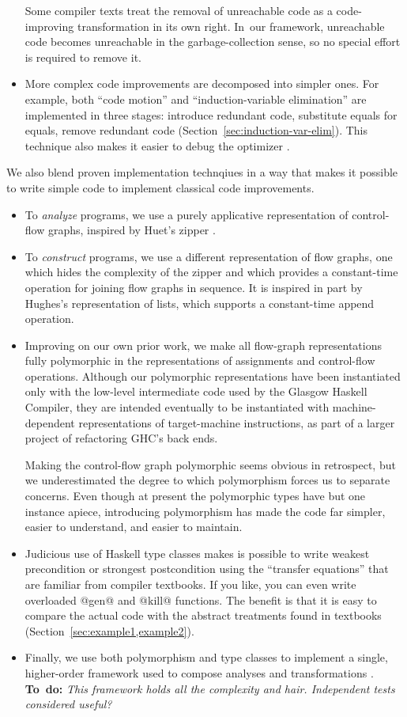 \documentclass[blockstyle,preprint,nocopyrightspace]{sigplanconf}
\let\cite\citep
\newcommand{\todo}[1]{\textbf{To~do:} \emph{#1}}
\newcommand\secref[1]{Section~\ref{sec:#1}}
\begin{document}
\begin{itemize}
Some compiler texts treat the removal of unreachable code as a
code-improving transformation in its own right.
In~our framework, unreachable code becomes unreachable in the
garbage-collection sense, so no special effort is required to remove
it.
\item
More complex code improvements are decomposed into simpler ones.
For example, both ``code motion'' and ``induction-variable
elimination'' are implemented in three stages: introduce redundant
code, substitute equals for equals, remove redundant code
(\secref{induction-var-elim}). 
This technique also makes it easier to debug the optimizer
\cite{whalley:isolation}. 
\end{itemize}

We also blend proven implementation technqiues
in a way that
makes it possible to
write simple code
to implement classical code improvements.
\begin{itemize}
\item
To \emph{analyze} programs, we use a purely applicative representation of
control-flow graphs, inspired by Huet's zipper
\cite{huet:zipper,ramsey-dias:applicative-flow-graph}. 
\item
To \emph{construct} programs, we use a different representation of
flow graphs, one which hides the complexity of the zipper and which
provides a constant-time operation for joining flow graphs in
sequence.
It is inspired in part by Hughes's \citeyearpar{hughes:novel-lists}
representation of lists, which supports a constant-time append operation.
\item
Improving on our own prior work, we make all flow-graph
representations fully polymorphic in the representations of
assignments and control-flow operations.
Although our polymorphic representations have been instantiated only
with the low-level intermediate code used by the Glasgow Haskell
Compiler, they are intended eventually to be instantiated with
machine-dependent representations of target-machine instructions, as
part of a larger project of refactoring GHC's back ends.

Making the control-flow graph polymorphic seems obvious in retrospect,
but we underestimated the degree to which polymorphism forces us to
separate concerns.
Even though at present the polymorphic types have but one instance
apiece, introducing polymorphism has made the code far simpler, easier
to understand, and easier to maintain.
\item
Judicious use of Haskell type classes makes is possible to write
weakest precondition or strongest postcondition using the ``transfer
equations'' that are familiar from compiler textbooks.
If you like, you can even write overloaded @gen@ and @kill@ functions.
The benefit is that it is easy to compare the actual code with the
abstract treatments found in textbooks (\secref{example1,example2}).
\item
Finally, we use both polymorphism and type classes to implement a single,
higher-order framework used to compose analyses and transformations
\cite{lerner-grove-chambers:2002}. 
\todo{This framework holds all the complexity and hair.  Independent
  tests considered useful?}
\end{itemize}
\end{document}
